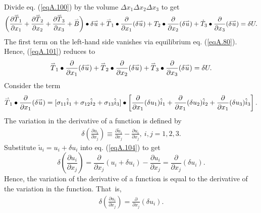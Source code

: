\documentclass{AeroStructure-ERJohnson}
\def\harp#1{\smash{\mathord{\buildrel{\lower3pt\hbox{$\scriptscriptstyle\rightharpoonup$}}\over{#1}}}}
\begin{document}
\vspace{-9pt}\noindent Divide eq. (\ref{eqA.100}) by the volume $\Delta x_{1} \Delta x_{2} \Delta x_{3}$ to get
\begin{align}\label{eqA.101}
\left(\frac{\partial \harp{T}_{1}}{\partial x_{1}}+\frac{\partial \harp{T}_{2}}{\partial x_{2}}+\frac{\partial \harp{T}_{3}}{\partial x_{3}}+\harp{B}\right) \bullet \delta \harp{u}+\harp{T}_{1} \bullet \frac{\partial}{\partial x_{1}}(\delta \harp{u})+T_{2} \bullet \frac{\partial}{\partial x_{2}}(\delta \harp{u})+\dot{T}_{3} \bullet \frac{\partial}{\partial x_{3}}(\delta \harp{u})=\delta U.
\end{align}
The first term on the left-hand side vanishes via equilibrium eq. (\ref{eqA.80}). Hence, (\ref{eqA.101}) reduces to
\begin{align}\label{eqA.102}
\harp{T}_{1} \bullet \frac{\partial}{\partial x_{1}}(\delta \harp{u})+\harp{T}_{2} \bullet \frac{\partial}{\partial x_{2}}(\delta \harp{u})+\harp{T}_{3} \bullet \frac{\partial}{\partial x_{3}}(\delta \harp{u})=\delta U.
\end{align}
Consider the term
\begin{align}\label{eqA.103}
\harp{T}_{1} \bullet \frac{\partial}{\partial x_{1}}(\delta \harp{u})=[\sigma_{11} \hat{i}_{1}+\sigma_{12} \hat{i}_{2}+\sigma_{13} \hat{i}_{3}] \bullet\left[\frac{\partial}{\partial x_{1}}(\delta u_{1}) \hat{i}_{1}+\frac{\partial}{\partial x_{1}}(\delta u_{2}) \hat{i}_{2}+\frac{\partial}{\partial x_{1}}(\delta u_{3}) \hat{i}_{3}\right].
\end{align}
The variation in the derivative of a function is defined by
\begin{align}\label{eqA.104}
\delta\left(\frac{\partial u_{i}}{\partial x_{j}}\right) \equiv \frac{\partial \tilde{u}_{i}}{\partial x_{j}}-\frac{\partial u_{i}}{\partial x_{j}},\ i, j=1,2,3.
\end{align}
Substitute $\tilde{u}_{i}=u_{i}+\delta u_{i}$ into eq. (\ref{eqA.104}) to get
\[
\delta\left(\frac{\partial u_{i}}{\partial x_{j}}\right)=\frac{\partial}{\partial x_{j}}(u_{i}+\delta u_{i})-\frac{\partial u_{i}}{\partial x_{j}}=\frac{\partial}{\partial x_{j}}(\delta u_{i}).
\]
Hence, the variation of the derivative of a function is equal to the derivative of the variation in the function. That~is,\vspace*{-6pt}
\begin{align}\label{eqA.105}
\delta\left(\frac{\partial u_{i}}{\partial x_{j}}\right)=\frac{\partial}{\partial x_{j}}(\delta u_{i}).
\end{align}
\end{document}
